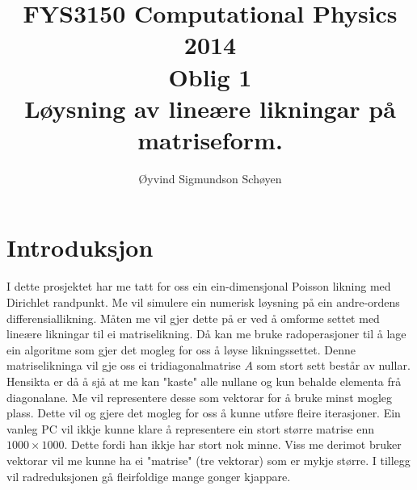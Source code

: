 \documentclass[11pt, a4paper]{article}
\begin{document}
\begin{titlepage}

  \title{\normalsize FYS3150 Computational Physics 2014\\
  \vspace{10mm}
  \huge Oblig 1\\
  \vspace{10mm}
  \normalsize {\bf Løysning av lineære likningar på matriseform.}}

  \author{Øyvind Sigmundson Schøyen}

\end{titlepage}
\maketitle

\newpage
  \tableofcontents
\newpage

\section{Introduksjon}
  I dette prosjektet har me tatt for oss ein ein-dimensjonal Poisson likning med Dirichlet randpunkt.
  Me vil simulere ein numerisk løysning på ein andre-ordens differensiallikning.
  Måten me vil gjer dette på er ved å omforme settet med lineære likningar til ei matriselikning. Då 
  kan me bruke radoperasjoner til å lage ein algoritme som gjer det mogleg for oss å løyse 
  likningssettet. Denne matriselikninga vil gje oss ei tridiagonalmatrise $A$ som stort sett består av  nullar. Hensikta er då å sjå at me kan "kaste" alle nullane og kun behalde elementa frå diagonalane.
  Me vil representere desse som vektorar for å bruke minst mogleg plass. Dette vil og gjere det mogleg  for oss å kunne utføre fleire iterasjoner. Ein vanleg PC vil ikkje kunne klare å representere ein 
  stort større matrise enn $1000\times1000$. Dette fordi han ikkje har stort nok minne. Viss me 
  derimot bruker vektorar vil me kunne ha ei "matrise" (tre vektorar) som er mykje større. I tillegg 
  vil radreduksjonen gå fleirfoldige mange gonger kjappare.
\end{document}

